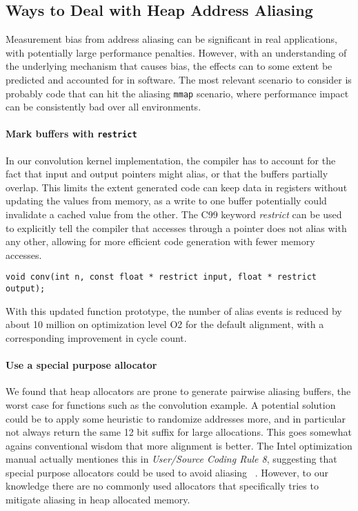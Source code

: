 \documentclass[prodmode,acmtaco]{acmsmall}
\begin{document}
{\subsection{Ways to Deal with Heap Address Aliasing}
Measurement bias from address aliasing can be significant in real applications, with potentially large performance penalties.
However, with an understanding of the underlying mechanism that causes bias, the effects can to some extent be predicted and accounted for in software.
The most relevant scenario to consider is probably code that can hit the aliasing \texttt{mmap} scenario, where performance impact can be consistently bad over all environments.

\paragraph{Mark buffers with \texttt{restrict}}
In our convolution kernel implementation, the compiler has to account for the fact that input and output pointers might alias, or that the buffers partially overlap.
This limits the extent generated code can keep data in registers without updating the values from memory, as a write to one buffer potentially could invalidate a cached value from the other.
The C99 keyword \emph{restrict} can be used to explicitly tell the compiler that accesses through a pointer does not alias with any other, allowing for more efficient code generation with fewer memory accesses.
\begin{lstlisting}[breaklines=true]
    void conv(int n, const float * restrict input, float * restrict output);
\end{lstlisting}
With this updated function prototype, the number of alias events is reduced by about 10 million on optimization level O2 for the default alignment, with a corresponding improvement in cycle count. %

\paragraph{Use a special purpose allocator}
We found that heap allocators are prone to generate pairwise aliasing buffers, the worst case for functions such as the convolution example.
A potential solution could be to apply some heuristic to randomize addresses more, and in particular not always return the same 12 bit suffix for large allocations.
This goes somewhat agains conventional wisdom that more alignment is better.
The Intel optimization manual actually mentiones this in \emph{User/Source Coding Rule 8}, suggesting that special purpose allocators could be used to avoid aliasing ~\cite{OptimizationManual}.
However, to our knowledge there are no commonly used allocators that specifically tries to mitigate aliasing in heap allocated memory.

}
\end{document}
